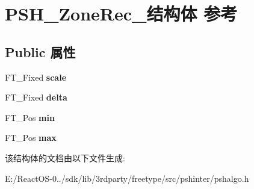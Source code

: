 \hypertarget{struct_p_s_h___zone_rec__}{}\section{P\+S\+H\+\_\+\+Zone\+Rec\+\_\+结构体 参考}
\label{struct_p_s_h___zone_rec__}
\subsection*{Public 属性}
\begin{DoxyCompactItemize}
\item 
\mbox{\label{struct_p_s_h___zone_rec___ab93eb10ed45acf60824a40ced702a920}} 
F\+T\+\_\+\+Fixed {\bfseries scale}
\item 
\mbox{\label{struct_p_s_h___zone_rec___adc0752fc9ceceb51a59fd25b86ba6ded}} 
F\+T\+\_\+\+Fixed {\bfseries delta}
\item 
\mbox{\label{struct_p_s_h___zone_rec___a59f0c416cf9cafe1649ec79d0f705ba8}} 
F\+T\+\_\+\+Pos {\bfseries min}
\item 
\mbox{\label{struct_p_s_h___zone_rec___a0e7356897012e58fae815290c2363978}} 
F\+T\+\_\+\+Pos {\bfseries max}
\end{DoxyCompactItemize}


该结构体的文档由以下文件生成\+:\begin{DoxyCompactItemize}
\item 
E\+:/\+React\+O\+S-\/0../sdk/lib/3rdparty/freetype/src/pshinter/pshalgo.\+h\end{DoxyCompactItemize}
